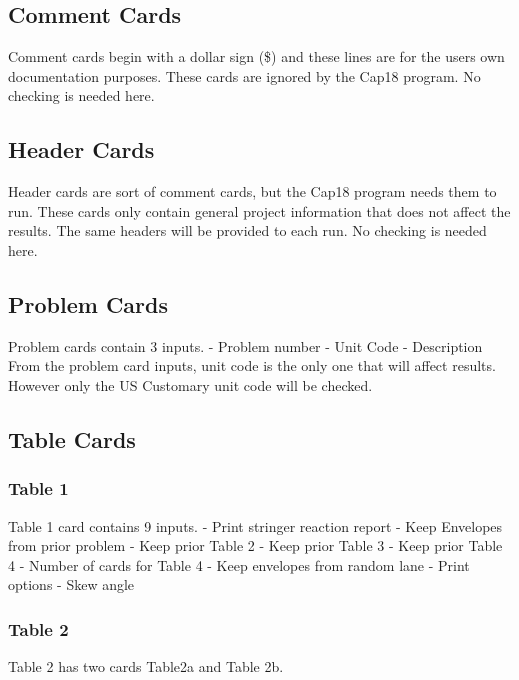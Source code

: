 \documentclass[
  letterpaper,
  DIV=11,
  numbers=noendperiod]{scrreprt}
\begin{document}
\subsection{Comment Cards}\label{comment-cards}

Comment cards begin with a dollar sign (\$) and these lines are for the
users own documentation purposes. These cards are ignored by the Cap18
program. No checking is needed here.

\subsection{Header Cards}\label{header-cards}

Header cards are sort of comment cards, but the Cap18 program needs them
to run. These cards only contain general project information that does
not affect the results. The same headers will be provided to each run.
No checking is needed here.

\subsection{Problem Cards}\label{problem-cards}

Problem cards contain 3 inputs. - Problem number - Unit Code -
Description From the problem card inputs, unit code is the only one that
will affect results. However only the US Customary unit code will be
checked.

\subsection{Table Cards}\label{table-cards}

\subsubsection{Table 1}\label{table-1}

Table 1 card contains 9 inputs. - Print stringer reaction report - Keep
Envelopes from prior problem - Keep prior Table 2 - Keep prior Table 3 -
Keep prior Table 4 - Number of cards for Table 4 - Keep envelopes from
random lane - Print options - Skew angle

\subsubsection{Table 2}\label{table-2}

Table 2 has two cards Table2a and Table 2b.
\end{document}
